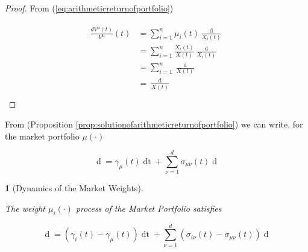 \documentclass[british]{amsart} \usepackage{lmodern}
\numberwithin{equation}{section} \numberwithin{figure}{section}
\theoremstyle{plain} \newtheorem{thm}{\protect\theoremname}[section]
\theoremstyle{definition} \newtheorem{defn}[thm]{\protect\definitionname}
\theoremstyle{plain} \newtheorem{assumption}[thm]{\protect\assumptionname}
\theoremstyle{plain} \newtheorem{lem}[thm]{\protect\lemmaname}
\theoremstyle{plain} \newtheorem{prop}[thm]{\protect\propositionname}
\theoremstyle{remark} \newtheorem{rem}[thm]{\protect\remarkname}
\theoremstyle{plain} \newtheorem{cor}[thm]{\protect\corollaryname}
\renewcommand{\d}[1]{\mathop{\mathrm{d}{#1}}}
\newcommand{\Vmu}{V^{\mu}}
\begin{document}
\begin{proof}

  From (\ref{eq:arithmeticreturnofportfolio})

  \begin{gather} 
    \begin{split} 
      \frac{d{\Vmu}(t)}{\Vmu}(t) 
      & =\sum_{i=1}^{n} \mu_{i}(t) \frac{\d{X_{i}(t)}}{X_{i}(t)} \\ 
      & = \sum_{i=1}^{n} \frac{X_{i}(t)}{X(t)} \frac{\d{X_{i}(t)}}{X_{i}(t)} \\ 
      & = \sum_{i=1}^{n} \frac{\d{X_{i}(t)}}{X(t)} \\ 
      & = \frac{\d{X(t)}}{X(t)} \\
    \end{split} 
  \end{gather}

\end{proof}

From (Proposition \ref{prop:solutionofarithmeticreturnofportfolio}) we can
write, for the market portfolio $\mu(\cdot)$

\begin{equation} 
  \label{eq:dlogV}
  \d{\log{\Vmu}(t)} =  \gamma_{\mu}(t)\d{t} + 
        \sum_{\nu=1}^{d} \sigma_{\mu\nu}(t) \d{W_{\nu}(t)} 
\end{equation}

\begin{prop} [Dynamics of the Market Weights]
  \label{prop:dynamicsofmarketweights}

  The weight $\mu_{i}(\cdot)$ process of the Market Portfolio satisfies 

  \begin{equation} 
    \d{\log{\mu_{i}(t)}} = (\gamma_{i}(t) - \gamma_{\mu}(t))\d{t} +
        \sum_{\nu=1}^{d} \left( \sigma_{i\nu}(t) - \sigma_{\mu\nu}(t) \right) \d{W_{\nu}(t)} 
  \end{equation}

\end{prop}
\end{document}
